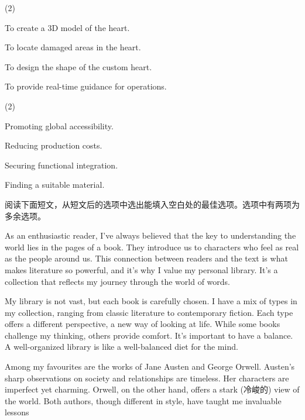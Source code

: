 \documentclass{英语试卷}
\begin{document}
\begin{choices}(2)
  \item To create a 3D model of the heart.
  \item To locate damaged areas in the heart.
  \item To design the shape of the custom heart.
  \item To provide real-time guidance for operations.
\end{choices}
\begin{choices}(2)
  \item Promoting global accessibility.
  \item Reducing production costs.
  \item Securing functional integration.
  \item Finding a suitable material.
\end{choices}
\par 阅读下面短文，从短文后的选项中选出能填入空白处的最佳选项。选项中有两项为多余选项。\par
\par As an enthusiastic reader, I've always believed that the key to understanding the world lies in the pages of a book.  They introduce us to characters who feel as real as the people around us. This connection between readers and the text is what makes literature so powerful, and it's why I value my personal library. It's a collection that reflects my journey through the world of words.\par
\par My library is not vast, but each book is carefully chosen. I have a mix of types in my collection, ranging from classic literature to contemporary fiction.  Each type offers a different perspective, a new way of looking at life. While some books challenge my thinking, others provide comfort. It's important to have a balance. A well-organized library is like a well-balanced diet for the mind.\par
\par Among my favourites are the works of Jane Austen and George Orwell. Austen's sharp observations on society and relationships are timeless. Her characters are imperfect yet charming. Orwell, on the other hand, offers a stark (冷峻的) view of the world.  Both authors, though different in style, have taught me invaluable lessons\par
\end{document}
